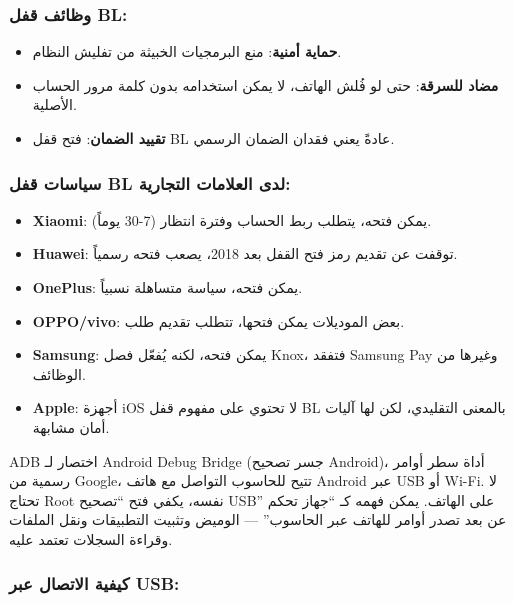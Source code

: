 \subsubsection*{وظائف قفل BL:}

\begin{itemize}
  \item \textbf{حماية أمنية}: منع البرمجيات الخبيثة من تفليش النظام.
  \item \textbf{مضاد للسرقة}: حتى لو فُلش الهاتف، لا يمكن استخدامه بدون كلمة مرور الحساب الأصلية.
  \item \textbf{تقييد الضمان}: فتح قفل BL عادةً يعني فقدان الضمان الرسمي.
\end{itemize}

\subsubsection*{سياسات قفل BL لدى العلامات التجارية:}

\begin{itemize}
  \item \textbf{Xiaomi}: يمكن فتحه، يتطلب ربط الحساب وفترة انتظار (7-30 يوماً).
  \item \textbf{Huawei}: توقفت عن تقديم رمز فتح القفل بعد 2018، يصعب فتحه رسمياً.
  \item \textbf{OnePlus}: يمكن فتحه، سياسة متساهلة نسبياً.
  \item \textbf{OPPO/vivo}: بعض الموديلات يمكن فتحها، تتطلب تقديم طلب.
  \item \textbf{Samsung}: يمكن فتحه، لكنه يُفعّل فصل Knox، فتفقد Samsung Pay وغيرها من الوظائف.
  \item \textbf{Apple}: أجهزة iOS لا تحتوي على مفهوم قفل BL بالمعنى التقليدي، لكن لها آليات أمان مشابهة.
\end{itemize}


ADB اختصار لـ Android Debug Bridge (جسر تصحيح Android)، أداة سطر أوامر رسمية من Google، تتيح للحاسوب التواصل مع هاتف Android عبر USB أو Wi-Fi. لا تحتاج Root نفسه، يكفي فتح “تصحيح USB” على الهاتف. يمكن فهمه كـ “جهاز تحكم عن بعد تصدر أوامر للهاتف عبر الحاسوب” — الوميض وتثبيت التطبيقات ونقل الملفات وقراءة السجلات تعتمد عليه.

\subsubsection*{كيفية الاتصال عبر USB:}

